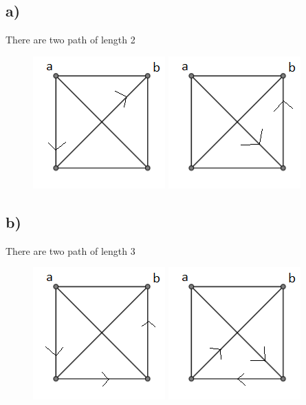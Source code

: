 \documentclass{article}
\begin{document}
\subsection*{a)}
There are two path of length 2\\
\begin{figure}[h]
    \centering
    \includegraphics{Question 6/connectivity_6.a.1.png}
    \includegraphics{Question 6/connectivity_6.a.2.png}
\end{figure}
\subsection*{b)}
There are two path of length 3\\
\begin{figure}[h]
    \centering
    \includegraphics{Question 6/connectivity_6.b.1.png}
    \includegraphics{Question 6/connectivity_6.b.2.png}
\end{figure}
\end{document}
